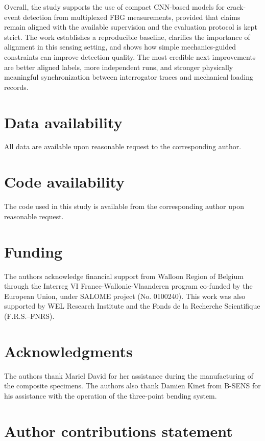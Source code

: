 \documentclass[fleqn,10pt]{wlscirep}
\begin{document}
Overall, the study supports the use of compact CNN-based models for crack-event detection from multiplexed FBG measurements, provided that claims remain aligned with the available supervision and the evaluation protocol is kept strict. The work establishes a reproducible baseline, clarifies the importance of alignment in this sensing setting, and shows how simple mechanics-guided constraints can improve detection quality. The most credible next improvements are better aligned labels, more independent runs, and stronger physically meaningful synchronization between interrogator traces and mechanical loading records.

\section*{Data availability}

All data are available upon reasonable request to the corresponding author.

\section*{Code availability}

The code used in this study is available from the corresponding author upon reasonable request.



\section*{Funding}

The authors acknowledge financial support from Walloon Region of Belgium through the Interreg VI France-Wallonie-Vlaanderen program co-funded by the European Union, under SALOME project (No. 0100240). This work was also supported by WEL Research Institute and the Fonds de la Recherche Scientifique (F.R.S.--FNRS).

\section*{Acknowledgments}

The authors thank Mariel David for her assistance during the manufacturing of the composite specimens. The authors also thank Damien Kinet from B-SENS for his assistance with the operation of the three-point bending system.


\section*{Author contributions statement}
\end{document}
